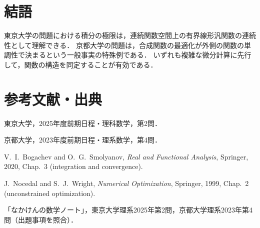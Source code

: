 \documentclass[a5paper,10pt,onecolumn]{jsarticle}
\theoremstyle{mathnotetheorem}
\begin{document}
\section{結語}
東京大学の問題における積分の極限は，連続関数空間上の有界線形汎関数の連続性として理解できる．
京都大学の問題は，合成関数の最適化が外側の関数の単調性で決まるという一般事実の特殊例である．
いずれも複雑な微分計算に先行して，関数の構造を同定することが有効である．

\section*{参考文献・出典}
\begin{enumerate}[label={[\arabic*]}]
\item 東京大学，2025年度前期日程・理科数学，第2問．
\item 京都大学，2023年度前期日程・理系数学，第4問．
\item V.~I.~Bogachev and O.~G.~Smolyanov, \textit{Real and Functional Analysis}, Springer, 2020, Chap.~3 (integration and convergence).
\item J.~Nocedal and S.~J.~Wright, \textit{Numerical Optimization}, Springer, 1999, Chap.~2 (unconstrained optimization).
\item 「なかけんの数学ノート」，東京大学理系2025年第2問，京都大学理系2023年第4問（出題事項を照合）．
\end{enumerate}
\end{document}
